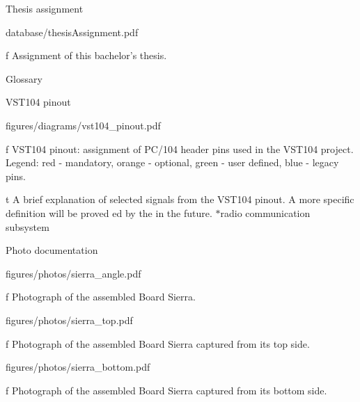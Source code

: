 

\app Thesis assignment

\midinsert
    \hsize \cinspic database/thesisAssignment.pdf
    \caption/f Assignment of this bachelor's thesis.
\endinsert




\app Glossary
\makeglos




\app VST104 pinout

\midinsert
    \hsize \cinspic figures/diagrams/vst104_pinout.pdf
    \caption/f VST104 pinout: assignment of PC/104 header pins used in the VST104 project. Legend: red - mandatory, orange - optional, green - user defined, blue - legacy pins.
\endinsert

\midinsert {}
    \caption/t A brief explanation of selected signals from the VST104 pinout. A more specific definition will be proved ed by the  in the future. $*$radio communication subsystem
\endinsert




\app Photo documentation

\midinsert
    \hsize \cinspic figures/photos/sierra_angle.pdf
    \caption/f Photograph of the assembled Board Sierra.
\endinsert

\midinsert
    \hsize \cinspic figures/photos/sierra_top.pdf
    \caption/f Photograph of the assembled Board Sierra captured from its top side.
\endinsert

\midinsert
    \hsize \cinspic figures/photos/sierra_bottom.pdf
    \caption/f Photograph of the assembled Board Sierra captured from its bottom side.
\endinsert

